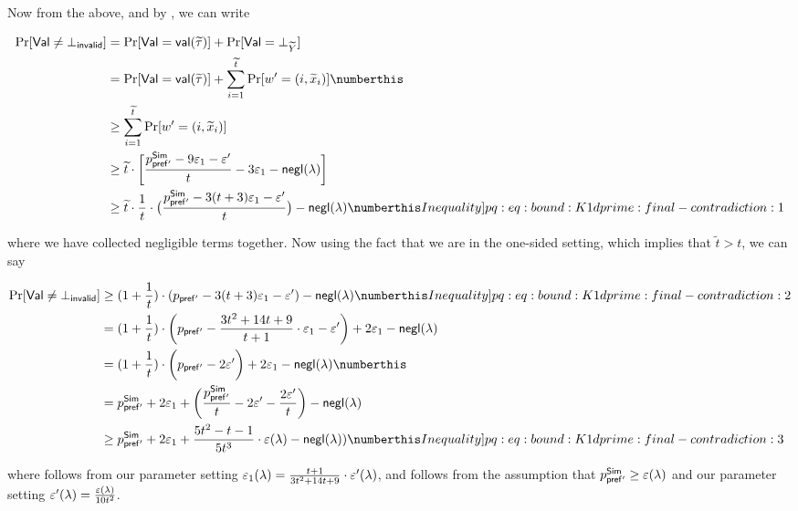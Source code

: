 Now from the above, and by , we can write

\begin{align*}
\Pr[\Val \ne \bot_{\msf{invalid}}] 
& = \Pr[\Val = \msf{val}(\tilde{\tau})]  + \Pr[\Val = \bot_{\tilde{Y}}] \\
& = \Pr[\Val = \msf{val}(\tilde{\tau})] + \sum_{i =1 }^{\tilde{t}} \Pr[w' = (i,\tilde{x}_i)] \numberthis \label{pq:eq:bound:K1dprime:final-contradiction:0}\\
& \ge  \sum_{i =1 }^{\tilde{t}} \Pr[w' = (i,\tilde{x}_i)] \\
& \geq \tilde{t}\cdot\bigg[\frac{p^{\msf{Sim}}_{\msf{pref'}} - 9\epsilon_1 - \epsilon'}{t} -3\epsilon_1 -\negl(\secpar)\bigg] \\
&\ge \tilde{t} \cdot \frac{1}{t} \cdot \big(\frac{p^{\msf{Sim}}_{\msf{pref'}} - 3(t+3)\epsilon_1 - \epsilon'}{t}\big) - \negl(\secpar) \numberthis \label[Inequality]{pq:eq:bound:K1dprime:final-contradiction:1}\\
\end{align*}

where we have collected negligible terms together. Now using the fact that we are in the one-sided setting, which implies that $\tilde{t} > t$, we can say

\begin{align*}
\Pr[\Val \ne \bot_{\msf{invalid}}] 
& \ge (1+\frac{1}{t}) \cdot (p_{\msf{pref'}}- 3(t+3)\epsilon_1 - \epsilon') - \negl(\secpar) \numberthis \label[Inequality]{pq:eq:bound:K1dprime:final-contradiction:2}\\
& = (1+\frac{1}{t}) \cdot \bigg(p_{\msf{pref'}}-\frac{3t^2+14t+9}{t+1}\cdot\epsilon_1 - \epsilon'\bigg)+ 2\epsilon_1 - \negl(\secpar) \\
& = (1+\frac{1}{t}) \cdot \bigg(p_{\msf{pref'}}- 2\epsilon'\bigg) + 2\epsilon_1 - \negl(\secpar) \numberthis \label{pq:eq:bound:K1dprime:final-contradiction:2.5}\\
& = p_{\msf{pref'}}^{\msf{Sim}}+ 2\epsilon_1 + \bigg(\frac{p^{\msf{Sim}}_{\msf{pref'}}}{t} - 2\epsilon' - \frac{2\epsilon'}{t}\bigg) - \negl(\secpar)\\
& \ge p^{\msf{Sim}}_{\msf{pref'}}+ 2\epsilon_1 + \frac{5t^2 - t -1}{5t^3}\cdot \epsilon(\secpar) - \negl(\secpar)) \numberthis \label[Inequality]{pq:eq:bound:K1dprime:final-contradiction:3}\\
\end{align*}

where  follows from our parameter setting $\varepsilon_1(\lambda)=\frac{t+1}{3t^2+14t+9}\cdot \varepsilon'(\lambda)$,  
and  follows from the assumption that $p^{\mathsf{Sim}}_{\mathsf{pref'}} \ge \varepsilon(\lambda)$ and our parameter setting $\varepsilon'(\lambda) = \frac{\varepsilon(\lambda)}{10t^2}$.

